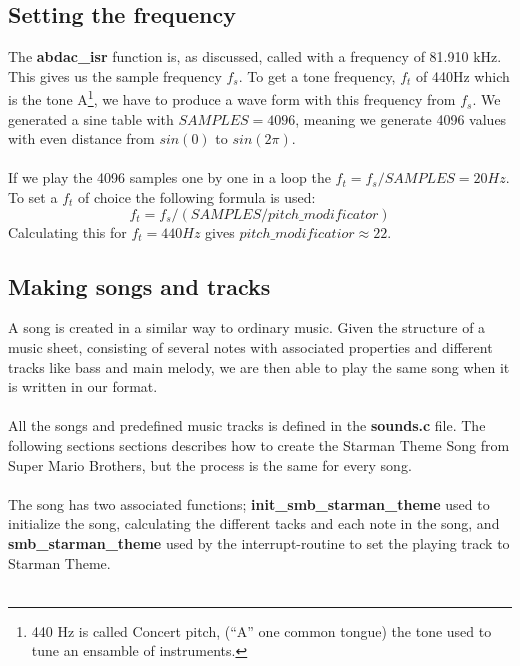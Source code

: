 \subsection{Setting the frequency}
The \textbf{abdac\_isr} function is, as discussed, called with a frequency of 81.910 kHz. This gives us the sample frequency $ f_s $. To
get a tone frequency, $f_t$ of 440Hz which is the tone A\footnote{440 Hz is called Concert pitch, (``A'' one common tongue) the tone used to tune an ensamble of instruments.},
we have to produce a wave form with this frequency from $f_s$. We generated a sine table with $SAMPLES = 4096$, meaning we
generate 4096 values with even distance from $sin(0)$ to $sin(2\pi)$.\\
\\
If we play the 4096 samples one by one in a loop the $f_t = f_s / SAMPLES = 20Hz$. To set a $f_t$ of choice the following formula
is used:
$$f_t = f_s / (SAMPLES / pitch\_modificator) $$
Calculating this for $f_t = 440 Hz$ gives $pitch\_modificatior \approx 22$.

\subsection{Making songs and tracks}
A song is created in a similar way to ordinary music.
Given the structure of a music sheet, consisting of several notes with associated
properties and different tracks like bass and main melody,
we are then able to play the same song when it is written in our format. \\
\\
All the songs and predefined music tracks is defined in the \textbf{sounds.c} file.
The following sections sections describes how to create the
Starman Theme Song\cite{smb-starman-theme} from Super Mario Brothers, but the process is the same
for every song.\\
\\
The song has two associated functions; \textbf{init\_smb\_starman\_theme} used to initialize
the song, calculating the different tacks and each note in the song,
and \textbf{smb\_starman\_theme} used by the interrupt-routine to set the playing track
to Starman Theme.\\
\\
